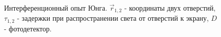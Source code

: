\begin{figure}
\centering



\caption{Интерференционный опыт Юнга. $\vec{r}_{1,2}$ - координаты
  двух отверстий, $\tau_{1,2}$ - задержки при распространении света от
отверстий к экрану, $D$ - фотодетектор.}
\label{figPart4Ch2_2}
\end{figure}
